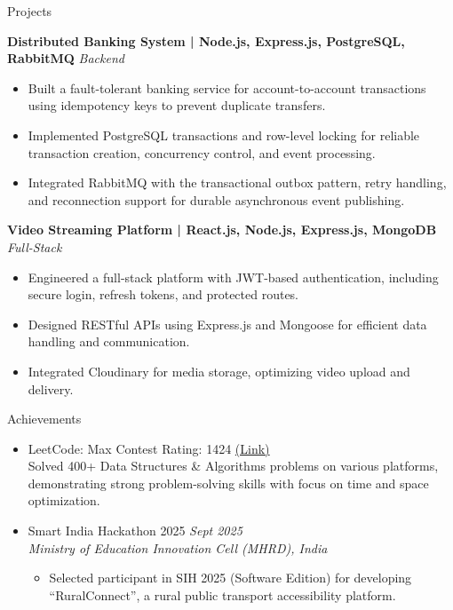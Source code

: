 \documentclass[12pt]{resume}
\begin{document}
\begin{rSection}{Projects}

\textbf{Distributed Banking System \;|\; Node.js, Express.js, PostgreSQL, RabbitMQ} \hfill \textit{Backend}
\begin{itemize}
\renewcommand\labelitemi{--}
    \item Built a fault-tolerant banking service for account-to-account transactions using idempotency keys to prevent duplicate transfers.
    \item Implemented PostgreSQL transactions and row-level locking for reliable transaction creation, concurrency control, and event processing.
    \item Integrated RabbitMQ with the transactional outbox pattern, retry handling, and reconnection support for durable asynchronous event publishing.
\end{itemize}

\textbf{Video Streaming Platform \;|\; React.js, Node.js, Express.js, MongoDB} \hfill \textit{Full-Stack}
\begin{itemize}
\renewcommand\labelitemi{--}
    \item Engineered a full-stack platform with JWT-based authentication, including secure login, refresh tokens, and protected routes.
    \item Designed RESTful APIs using Express.js and Mongoose for efficient data handling and communication.
    \item Integrated Cloudinary for media storage, optimizing video upload and delivery.
\end{itemize}

\end{rSection}

\begin{rSection}{Achievements}
\begin{itemize}[leftmargin=0.5cm]

\item \textmd{LeetCode:} \textmd{Max Contest Rating: 1424} \href{https://leetcode.com/u/atreeverma/}{(Link)}\\
Solved 400+ Data Structures \& Algorithms problems on various platforms, demonstrating strong problem-solving skills with focus on time and space optimization.

\item \textmd{Smart India Hackathon 2025} \hfill \textit{Sept 2025} \\
\textit{Ministry of Education Innovation Cell (MHRD), India}
\begin{itemize}
    \item Selected participant in SIH 2025 (Software Edition) for developing ``RuralConnect'', a rural public transport accessibility platform.
\end{itemize}

\end{itemize}
\end{rSection}
\end{document}

